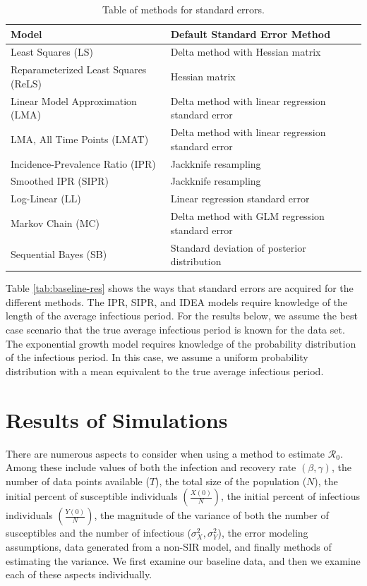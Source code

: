 \documentclass[12pt]{article}
\newcommand{\rr}{\ensuremath{\mathcal{R}_0}}
\begin{document}
\begin{table}[H]
	\centering
	\begin{tabular}{@{}ll@{}}
		\toprule
		\textbf{Model} & \textbf{Default Standard Error Method} \\ \midrule
		Least Squares (LS) & Delta method with Hessian matrix\\
		Reparameterized Least Squares (ReLS) & Hessian matrix \\
		Linear Model Approximation (LMA) & Delta method with linear regression standard error \\
		LMA, All Time Points  (LMAT)& Delta method with linear regression standard error \\
		Incidence-Prevalence Ratio (IPR) & Jackknife resampling \\
		Smoothed IPR (SIPR) & Jackknife resampling \\
		Log-Linear (LL) & Linear regression standard error \\
		Markov Chain (MC) & Delta method with GLM regression standard error \\
		Sequential Bayes (SB) & Standard deviation of posterior distribution\\
		\bottomrule
	\end{tabular}
	\caption{Table of methods for standard errors.}
	\label{tab:se-methods}
\end{table}

Table \ref{tab:baseline-res} shows the ways that standard errors are acquired for the different methods. The IPR, SIPR, and IDEA models require knowledge of the length of the average infectious period. For the results below, we assume the best case scenario that the true average infectious period is known for the data set. The exponential growth model requires knowledge of the probability distribution of the infectious period. In this case, we assume a uniform probability distribution with a mean equivalent to the true average infectious period.

\section{Results of Simulations}\label{sec:results}
There are numerous aspects to consider when using a method to estimate $\rr$.  Among these include values of both the infection and recovery rate $(\beta, \gamma)$, the number of data points available ($T$), the total size of the population ($N$), the initial percent of susceptible individuals $\left (\frac{X(0)}{N}\right)$, the initial percent of infectious individuals $\left (\frac{Y(0)}{N}\right )$, the magnitude of the variance of both the number of susceptibles and the number of infectious ($\sigma_X^2, \sigma_Y^2$), the error modeling assumptions, data generated from a non-SIR model, and finally methods of estimating the variance.  We first examine our baseline data, and then we examine each of these aspects individually.
\end{document}
